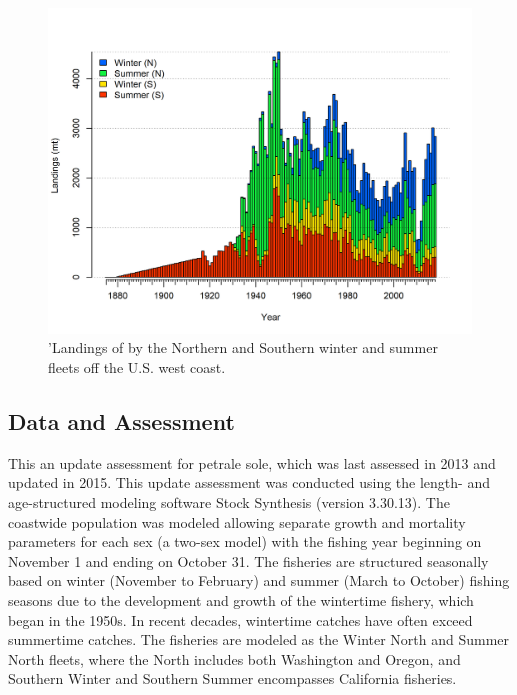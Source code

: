 \documentclass[12pt,]{article}
\begin{document}
\begin{figure}
\centering
\includegraphics{r4ss/plots_mod1/catch2 landings stacked.png}
\caption{'Landings of by the Northern and Southern winter and summer
fleets off the U.S. west coast. \label{fig:Exec_catch1}}
\end{figure}

\FloatBarrier

\subsection*{Data and Assessment}\label{data-and-assessment}

This an update assessment for petrale sole, which was last assessed in
2013 and updated in 2015. This update assessment was conducted using the
length- and age-structured modeling software Stock Synthesis (version
3.30.13). The coastwide population was modeled allowing separate growth
and mortality parameters for each sex (a two-sex model) with the fishing
year beginning on November 1 and ending on October 31. The fisheries are
structured seasonally based on winter (November to February) and summer
(March to October) fishing seasons due to the development and growth of
the wintertime fishery, which began in the 1950s. In recent decades,
wintertime catches have often exceed summertime catches. The fisheries
are modeled as the Winter North and Summer North fleets, where the North
includes both Washington and Oregon, and Southern Winter and Southern
Summer encompasses California fisheries.
\end{document}
